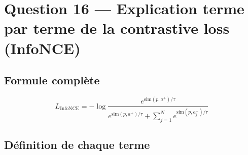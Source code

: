 \documentclass[11pt,a4paper]{article}
\begin{document}
\section{Question 16 — Explication terme par terme de la contrastive loss (InfoNCE)}

\subsection{Formule complète}

\begin{equation}
L_{\text{InfoNCE}} = -\log \frac{e^{\text{sim}(p, a^+)/\tau}}{e^{\text{sim}(p, a^+)/\tau} + \sum_{j=1}^{N} e^{\text{sim}(p, a_j^-)/\tau}}
\end{equation}

\subsection{Définition de chaque terme}
\end{document}
